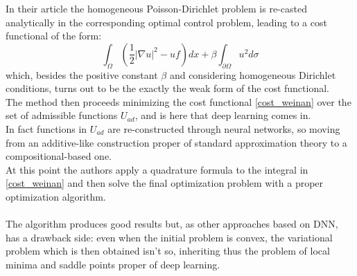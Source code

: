 \documentclass[12pt, a4paper]{report}
\theoremstyle{definition}
\begin{document}
{In their article the homogeneous Poisson-Dirichlet problem is re-casted analytically in the corresponding optimal control problem, leading to a cost functional of the form:
\begin{equation}\label{cost_weinan}
\int_{\Omega}\left(\frac{1}{2} |\nabla u|^2 - uf \right)dx + \beta \int_{\partial\Omega}u^2 d\sigma
\end{equation}
which, besides the positive constant $\beta$ and considering homogeneous Dirichlet conditions, turns out to be the exactly the weak form of the \cite{Kailai} cost functional.\\
The method then proceeds minimizing the cost functional \eqref{cost_weinan} over the set of admissible functions $U_{ad}$, and is here that deep learning comes in. \\
In fact functions in $U_{ad}$ are re-constructed through neural networks, so moving from an additive-like construction proper of standard approximation theory to a compositional-based one.\\
At this point the authors apply a quadrature formula to the integral in \eqref{cost_weinan} and then solve the final optimization problem with a proper optimization algorithm.\\\\
\noindent The algorithm produces good results but, as other approaches based on DNN, has a drawback side: even when the initial problem is convex, the variational problem which is then obtained isn't so, inheriting thus the problem of local minima and saddle points proper of deep learning.

}
\end{document}
